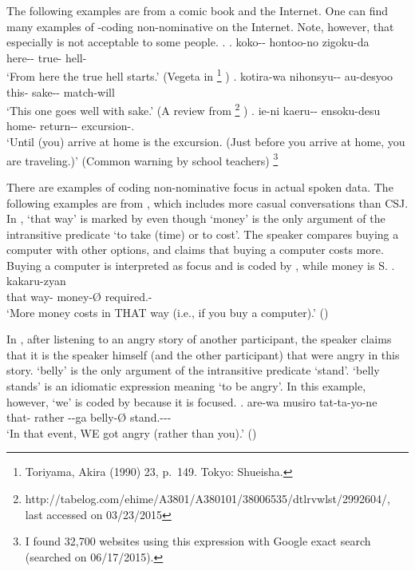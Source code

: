 The following examples are from a comic book and the Internet.
One can find many examples of -coding non-nominative on the Internet.
Note, however, that
especially \Next[b] is not acceptable to some people.
%
\ex.
 \ag. koko-- hontoo-no zigoku-da \\
      here-- true- hell- \\
      `From here the true hell starts.'
      \hfill{(Vegeta in %
      \footnote{
      Toriyama, Akira (1990)  23, p.~149. Tokyo: Shueisha.
      }
      )}
 \bg. kotira-wa nihonsyu-- au-desyoo \\
      this- sake-- match-will \\
      `This one goes well with sake.'
      \hfill{(A review from %
       \footnote{http://tabelog.com/ehime/A3801/A380101/38006535/dtlrvwlst/2992604/, last accessed on 03/23/2015}
      )}
  \bg. ie-ni kaeru-- ensoku-desu \\
       home- return-- excursion-. \\
       `Until (you) arrive at home is the excursion. (Just before you arrive at home, you are traveling.)'
       \hfill{(Common warning by school teachers)}%
       \footnote{
       I found 32,700 websites using this expression with Google exact search (searched on 06/17/2015).
       }


There are examples of  coding non-nominative focus
in actual spoken data.
The following examples are from  \cite{Den_2007_SAC},
which includes more casual conversations than CSJ.
In \Next,
 `that way' is marked by  even though  `money' is the only argument of the intransitive predicate  `to take (time) or to cost'.
The speaker compares buying a computer with other options,
and claims that buying a computer costs more.
Buying a computer is interpreted as focus and is coded by ,
while money is S.
%
\exg.    kakaru-zyan \\
	that way- money-{\O} required.- \\
	`More money costs in THAT way (i.e., if you buy a computer).' \hfill{()}

In \Next,
after listening to an angry story of another participant,
the speaker claims that it is the speaker himself (and the other participant) that were angry in this story.
 `belly' is the only argument of the intransitive predicate  `stand'.
 `belly stands' is an idiomatic expression meaning `to be angry'.
In this example,
however,
 `we' is coded by 
because it is focused.
\exg. are-wa musiro   tat-ta-yo-ne \\
	that- rather --ga belly-{\O} stand.--- \\
	`In that event, WE got angry (rather than you).' \hfill{()}

